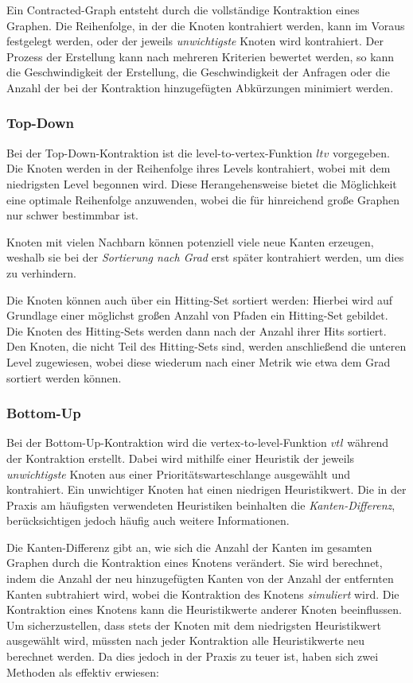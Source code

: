 Ein Contracted-Graph entsteht durch die vollständige Kontraktion eines Graphen.
Die Reihenfolge, in der die Knoten kontrahiert werden, kann im Voraus festgelegt werden, oder der jeweils \emph{unwichtigste} Knoten wird kontrahiert.
Der Prozess der Erstellung kann nach mehreren Kriterien bewertet werden, so kann die Geschwindigkeit der Erstellung, die Geschwindigkeit der Anfragen oder die Anzahl der bei der Kontraktion hinzugefügten Abkürzungen minimiert werden.

\subsubsection{Top-Down}
Bei der Top-Down-Kontraktion ist die level-to-vertex-Funktion ${ltv}$ vorgegeben.
Die Knoten werden in der Reihenfolge ihres Levels kontrahiert, wobei mit dem niedrigsten Level begonnen wird.
Diese Herangehensweise bietet die Möglichkeit eine optimale Reihenfolge anzuwenden, wobei die für hinreichend große Graphen nur schwer bestimmbar ist.

Knoten mit vielen Nachbarn können potenziell viele neue Kanten erzeugen, weshalb sie bei der \emph{Sortierung nach Grad} erst später kontrahiert werden, um dies zu verhindern.

Die Knoten können auch über ein Hitting-Set sortiert werden:
Hierbei wird auf Grundlage einer möglichst großen Anzahl von Pfaden ein Hitting-Set gebildet.
Die Knoten des Hitting-Sets werden dann nach der Anzahl ihrer Hits sortiert.
Den Knoten, die nicht Teil des Hitting-Sets sind, werden anschließend die unteren Level zugewiesen, wobei diese wiederum nach einer Metrik wie etwa dem Grad sortiert werden können.

\subsubsection{Bottom-Up}

Bei der Bottom-Up-Kontraktion wird die vertex-to-level-Funktion ${vtl}$ während der Kontraktion erstellt.
Dabei wird mithilfe einer Heuristik der jeweils \emph{unwichtigste} Knoten aus einer Prioritätswarteschlange ausgewählt und kontrahiert.
Ein unwichtiger Knoten hat einen niedrigen Heuristikwert.
Die in der Praxis am häufigsten verwendeten Heuristiken beinhalten die \emph{Kanten-Differenz}, berücksichtigen jedoch häufig auch weitere Informationen.

Die Kanten-Differenz gibt an, wie sich die Anzahl der Kanten im gesamten Graphen durch die Kontraktion eines Knotens verändert.
Sie wird berechnet, indem die Anzahl der neu hinzugefügten Kanten von der Anzahl der entfernten Kanten subtrahiert wird, wobei die Kontraktion des Knotens \emph{simuliert} wird.
Die Kontraktion eines Knotens kann die Heuristikwerte anderer Knoten beeinflussen.
Um sicherzustellen, dass stets der Knoten mit dem niedrigsten Heuristikwert ausgewählt wird, müssten nach jeder Kontraktion alle Heuristikwerte neu berechnet werden.
Da dies jedoch in der Praxis zu teuer ist, haben sich zwei Methoden als effektiv erwiesen:

